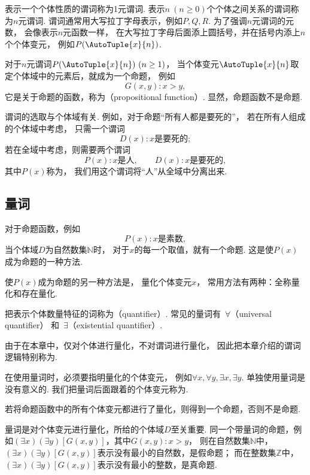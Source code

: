 表示一个个体性质的谓词称为1元谓词.
表示\(n\ (n\geq0)\)个个体之间关系的谓词称为\(n\)元谓词.
谓词通常用大写拉丁字母表示，例如\(P,Q,R\).
为了强调\(n\)元谓词的元数，
会像表示\(n\)元函数一样，
在大写拉丁字母后面添上圆括号，并在括号内添上\(n\)个个体变元，
例如\(P(\AutoTuple{x}{n})\).

对于\(n\)元谓词\(P(\AutoTuple{x}{n})\ (n\geq1)\)，
当个体变元\(\AutoTuple{x}{n}\)取定个体域中的元素后，就成为一个命题，
例如\[
	G(x,y):
	x>y,
\]
它是关于命题的函数，称为（propositional function）.
显然，命题函数不是命题.

\begin{remark}
谓词的选取与个体域有关.
例如，对于命题“所有人都是要死的”，
若在所有人组成的个体域中考虑，
只需一个谓词\[
	D(x):
	\text{$x$是要死的};
\]
若在全域中考虑，则需要两个谓词\[
	P(x):
	\text{$x$是人},
	\qquad
	D(x):
	\text{$x$是要死的},
\]
其中\(P(x)\)称为，
我们用这个谓词将“人”从全域中分离出来.
\end{remark}

\subsection{量词}
对于命题函数，例如\[
	P(x):
	\text{$x$是素数},
\]
当个体域\(D\)为自然数集\(\mathbb{N}\)时，
对于\(x\)的每一个取值，就有一个命题.
这是使\(P(x)\)成为命题的一种方法.

使\(P(x)\)成为命题的另一种方法是，
量化个体变元\(x\)，
常用方法有两种：全称量化和存在量化.

把表示个体数量特征的词称为（quantifier）.
常见的量词有~\(\forall\)（universal quantifier）
和~\(\exists\)（existential quantifier）.

由于在本章中，仅对个体进行量化，不对谓词进行量化，
因此把本章介绍的谓词逻辑特别称为.

在使用量词时，必须要指明量化的个体变元，
例如\(\forall x,\forall y,\exists x,\exists y\).
单独使用量词是没有意义的.
我们把量词后面跟着的个体变元称为.

若将命题函数中的所有个体变元都进行了量化，则得到一个命题，否则不是命题.

量词是对个体变元进行量化，所给的个体域\(D\)至关重要.
同一个带量词的命题，例如\((\exists x)(\exists y)[G(x,y)]\)，其中\(G(x,y): x>y\)，
则在自然数集\(\mathbb{N}\)中，\((\exists x)(\exists y)[G(x,y)]\)表示没有最小的自然数，是假命题；
而在整数集\(\mathbb{Z}\)中，\((\exists x)(\exists y)[G(x,y)]\)表示没有最小的整数，是真命题.

